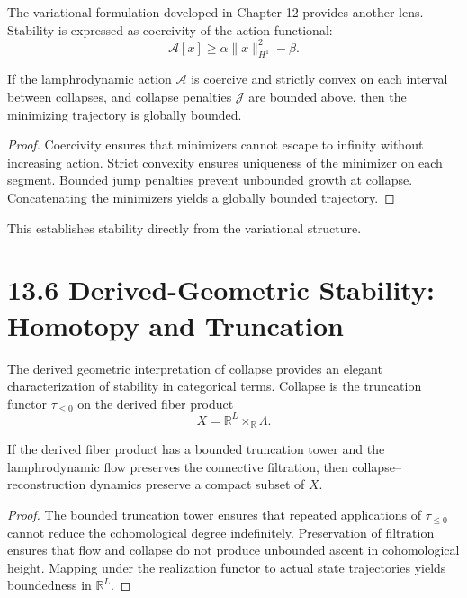 The variational formulation developed in Chapter 12 provides another lens. Stability is expressed as coercivity of the action functional:
\[
\mathcal{A}[x] \ge \alpha \|x\|_{H^1}^2 - \beta.
\]

\begin{theorem}
If the lamphrodynamic action $\mathcal{A}$ is coercive and strictly convex on each interval between collapses, and collapse penalties $\mathcal{J}$ are bounded above, then the minimizing trajectory is globally bounded.
\end{theorem}

\begin{proof}
Coercivity ensures that minimizers cannot escape to infinity without increasing action. Strict convexity ensures uniqueness of the minimizer on each segment. Bounded jump penalties prevent unbounded growth at collapse. Concatenating the minimizers yields a globally bounded trajectory.
\end{proof}

This establishes stability directly from the variational structure.

\section*{13.6 Derived-Geometric Stability: Homotopy and Truncation}

The derived geometric interpretation of collapse provides an elegant characterization of stability in categorical terms. Collapse is the truncation functor $\tau_{\le0}$ on the derived fiber product
\[
X = \mathbb{R}^{L} \times_{\mathbb{R}} \Lambda.
\]

\begin{theorem}
If the derived fiber product has a bounded truncation tower and the lamphrodynamic flow preserves the connective filtration, then collapse–reconstruction dynamics preserve a compact subset of $X$.
\end{theorem}

\begin{proof}
The bounded truncation tower ensures that repeated applications of $\tau_{\le0}$ cannot reduce the cohomological degree indefinitely. Preservation of filtration ensures that flow and collapse do not produce unbounded ascent in cohomological height. Mapping under the realization functor to actual state trajectories yields boundedness in $\mathbb{R}^{L}$.
\end{proof}

